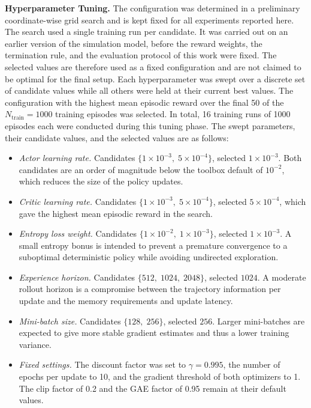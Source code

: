 \documentclass{ieeeaccess}
\begin{document}
\textbf{Hyperparameter Tuning.} The configuration was determined in a preliminary
coordinate-wise grid search and is kept fixed for all experiments reported here. The search
used a single training run per candidate. It was carried out on an earlier version of the simulation
model, before the reward weights, the termination rule, and the evaluation protocol of this work were
fixed. The selected values are therefore used as a fixed configuration and are not claimed to be optimal
for the final setup. Each hyperparameter was swept over a discrete set of candidate values while all
others were held at their current best values. The configuration with the highest mean episodic reward
over the final 50 of the $N_{\mathrm{train}}=1000$ training episodes was selected. In total, 16 training
runs of 1000 episodes each were conducted during this tuning phase. The swept parameters, their candidate
values, and the selected values are as follows:
\begin{itemize}
  \item \textit{Actor learning rate.} Candidates $\{1\!\times\!10^{-3},\;5\!\times\!10^{-4}\}$,
  selected $1\!\times\!10^{-3}$. Both candidates are an order of magnitude below the toolbox
  default of $10^{-2}$, which reduces the size of the policy updates.
  \item \textit{Critic learning rate.} Candidates $\{1\!\times\!10^{-3},\;5\!\times\!10^{-4}\}$,
  selected $5\!\times\!10^{-4}$, which gave the highest mean episodic reward in the search.
  \item \textit{Entropy loss weight.} Candidates $\{1\!\times\!10^{-2},\;1\!\times\!10^{-3}\}$, selected
  $1\!\times\!10^{-3}$. A small entropy bonus is intended to prevent a premature convergence to a
  suboptimal deterministic policy while avoiding undirected exploration.
  \item \textit{Experience horizon.} Candidates $\{512,\;1024,\;2048\}$, selected $1024$. A moderate rollout horizon
  is a compromise between the trajectory information per update and the memory requirements and update latency.
  \item \textit{Mini-batch size.} Candidates $\{128,\;256\}$, selected $256$. Larger mini-batches are expected to give
  more stable gradient estimates and thus a lower training variance.
  \item  \textit{Fixed settings.} The discount factor was set to $\gamma = 0.995$,
  the number of epochs per update to 10, and the gradient threshold of both optimizers to 1. The
  clip factor of 0.2 and the GAE factor of 0.95 remain at their default values.
\end{itemize}
\end{document}

